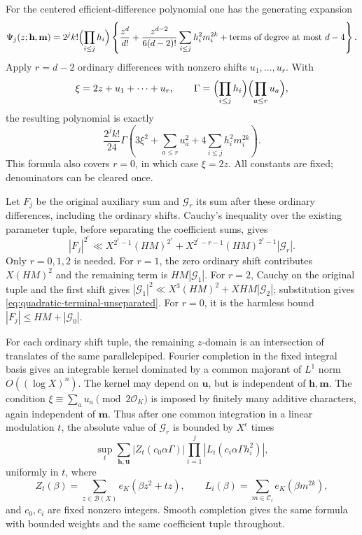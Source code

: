 \documentclass[11pt]{amsart}
\theoremstyle{definition}
\numberwithin{equation}{section}
\begin{document}
For the centered efficient-difference polynomial one has the generating
expansion
\[
 \Psi_j(z;\mathbf h,\mathbf m)
 =2^jk!\Bigl(\prod_{i\le j}h_i\Bigr)
 \left\{\frac{z^d}{d!}
   +\frac{z^{d-2}}{6(d-2)!}\sum_{i\le j}h_i^2m_i^{2k}
   +\text{terms of degree at most }d-4\right\}.
\]
Apply $r=d-2$ ordinary differences with nonzero shifts $u_1,\ldots,u_r$.
With
\[
 \xi=2z+u_1+\cdots+u_r,\qquad
 \Gamma=\Bigl(\prod_{i\le j}h_i\Bigr)\Bigl(\prod_{a\le r}u_a\Bigr),
\]
the resulting polynomial is exactly
\begin{equation}\label{eq:quadratic-terminal-exact}
 \frac{2^jk!}{24}\Gamma
 \left(3\xi^2+\sum_{a\le r}u_a^2
                         +4\sum_{i\le j}h_i^2m_i^{2k}\right).
\end{equation}
This formula also covers $r=0$, in which case $\xi=2z$.
All constants are fixed; denominators can be cleared once.

Let $F_j$ be the original auxiliary sum and $\mathcal G_r$ its sum after
these ordinary differences, including the ordinary shifts. Cauchy's
inequality over the existing parameter tuple, before separating the
coefficient sums, gives
\begin{equation}\label{eq:quadratic-terminal-unseparated}
 |F_j|^{2^r}\ll
       X^{2^r-1}(HM)^{2^r}
       +X^{2^r-r-1}(HM)^{2^r-1}|\mathcal G_r|.
\end{equation}
Only $r=0,1,2$ is needed. For $r=1$, the zero ordinary shift contributes
$X(HM)^2$ and the remaining term is $HM|\mathcal G_1|$.
For $r=2$, Cauchy on the original tuple and the first shift gives
$|\mathcal G_1|^2\ll X^3(HM)^2+XHM|\mathcal G_2|$; substitution gives
\eqref{eq:quadratic-terminal-unseparated}. For $r=0$, it is the harmless bound
$|F_j|\le HM+|\mathcal G_0|$.

For each ordinary shift tuple, the remaining $z$-domain is an intersection
of translates of the same parallelepiped. Fourier completion in the fixed
integral basis gives an integrable kernel dominated by a common majorant
of $L^1$ norm $O((\log X)^n)$. The kernel may depend on $\mathbf u$, but
is independent of $\mathbf h,\mathbf m$. The condition
$\xi\equiv\sum_a u_a\pmod{2\mathcal O_K}$ is imposed by finitely many
additive characters, again independent of $\mathbf m$. Thus after one
common integration in a linear modulation $t$, the absolute value of
$\mathcal G_r$ is bounded by $X^\epsilon$ times
\begin{equation}\label{eq:quadratic-terminal-completion}
 \sup_t\sum_{\mathbf h,\mathbf u}
       |Z_t(c_0\alpha\Gamma)|
       \prod_{i=1}^j|L_i(c_i\alpha\Gamma h_i^2)|,
\end{equation}
uniformly in $t$, where
\[
 Z_t(\beta)=\sum_{z\in\mathcal B(X)}e_K(\beta z^2+tz),\qquad
 L_i(\beta)=\sum_{m\in\mathcal C_i}e_K(\beta m^{2k}),
\]
and $c_0,c_i$ are fixed nonzero integers. Smooth completion gives the same
formula with bounded weights and the same coefficient tuple throughout.
\end{document}
